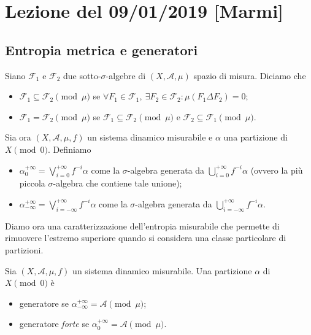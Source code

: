 \section{Lezione del 09/01/2019 [Marmi]}

\subsection{Entropia metrica e generatori}
\begin{definition}
    Siano $ \mathcal{F}_1 $ e $ \mathcal{F}_2 $ due sotto-$ \sigma $-algebre di $ (X, \mathcal{A}, \mu) $ spazio di misura. Diciamo che
    \begin{itemize}
        \item $ \mathcal{F}_1 \subseteq \mathcal{F}_2 \pmod{\mu} $ se $ \forall F_1 \in \mathcal{F}_1, \ \exists F_2 \in \mathcal{F_2} : \mu(F_1 \Delta F_2) = 0 $;
        \item $ \mathcal{F_1} = \mathcal{F_2} \pmod{\mu} $ se $ \mathcal{F}_1 \subseteq \mathcal{F}_2 \pmod{\mu} $ e $ \mathcal{F}_2 \subseteq \mathcal{F}_1 \pmod{\mu} $.
    \end{itemize}
\end{definition}

Sia ora $ (X, \mathcal{A}, \mu, f) $ un sistema dinamico misurabile e $ \alpha $ una partizione di $ X \pmod{0} $. Definiamo
\begin{itemize}
    \item $ \alpha_{0}^{+\infty} = \bigvee_{i=0}^{+\infty}f^{-i}\alpha $ come la $ \sigma $-algebra generata da $ \bigcup_{i=0}^{+\infty} f^{-i}\alpha $ (ovvero la più piccola $ \sigma $-algebra che contiene tale unione);
    \item $ \alpha_{-\infty}^{+\infty} = \bigvee_{i=-\infty}^{+\infty}f^{-i}\alpha $ come la $ \sigma $-algebra generata da $ \bigcup_{i=-\infty}^{+\infty} f^{-i}\alpha $.
\end{itemize}

Diamo ora una caratterizzazione dell'entropia misurabile che permette di rimuovere l'estremo superiore quando si considera una classe particolare di partizioni.

\begin{definition}[generatore]
    Sia $ (X, \mathcal{A}, \mu, f) $ un sistema dinamico misurabile. Una partizione $ \alpha $ di $ X \pmod{0} $ è
    \begin{itemize}
        \item generatore se $ \alpha_{-\infty}^{+\infty} = \mathcal{A} \pmod{\mu} $;
        \item generatore \emph{forte} se $ \alpha_{0}^{+\infty} = \mathcal{A} \pmod{\mu} $.
    \end{itemize}
\end{definition}

